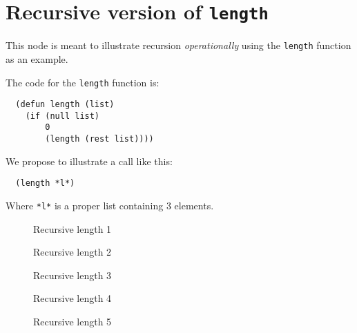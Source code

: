 \chapter{Recursive version of \texttt{length}}

This node is meant to illustrate recursion \emph{operationally} using
the \texttt{length} function as an example.

The code for the \texttt{length} function is:

\begin{verbatim}
  (defun length (list)
    (if (null list)
        0
        (length (rest list))))
\end{verbatim}

We propose to illustrate a call like this:

\begin{verbatim}
  (length *l*)
\end{verbatim}

Where \texttt{*l*} is a proper list containing $3$ elements.

\begin{figure}
\begin{center}
\end{center}
\caption{\label{fig-recursion-length-1}
Recursive length 1}
\end{figure}

\begin{figure}
\begin{center}
\end{center}
\caption{\label{fig-recursion-length-2}
Recursive length 2}
\end{figure}

\begin{figure}
\begin{center}
\end{center}
\caption{\label{fig-recursion-length-3}
Recursive length 3}
\end{figure}

\begin{figure}
\begin{center}
\end{center}
\caption{\label{fig-recursion-length-4}
Recursive length 4}
\end{figure}

\begin{figure}
\begin{center}
\end{center}
\caption{\label{fig-recursion-length-5}
  Recursive length 5}
\end{figure}


